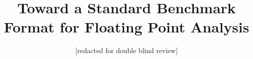 \documentclass{llncs}
\begin{document}
\title{Toward a Standard Benchmark Format for Floating Point Analysis}
\author{[redacted for double blind review]}
\maketitle






\end{document}
